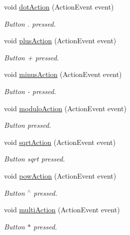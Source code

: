 \begin{DoxyCompactItemize}
void \hyperlink{classGUI__Controller_abab880a50c742388974a9f96e147e1f5}{dot\+Action} (Action\+Event event)
\begin{DoxyCompactList}\small\item\em Button \textquotesingle{}.\textquotesingle{} pressed. \end{DoxyCompactList}\item 
void \hyperlink{classGUI__Controller_a1a2f902a1462a48bf26769d4ee3689c7}{plus\+Action} (Action\+Event event)
\begin{DoxyCompactList}\small\item\em Button \textquotesingle{}+\textquotesingle{} pressed. \end{DoxyCompactList}\item 
void \hyperlink{classGUI__Controller_a01a8f10c74c34426cd923b699d5da5b3}{minus\+Action} (Action\+Event event)
\begin{DoxyCompactList}\small\item\em Button \textquotesingle{}-\/\textquotesingle{} pressed. \end{DoxyCompactList}\item 
void \hyperlink{classGUI__Controller_a0a15fea5ff39777ca3ec7f52e5d35500}{modulo\+Action} (Action\+Event event)
\begin{DoxyCompactList}\small\item\em Button \textquotesingle{}\textquotesingle{} pressed. \end{DoxyCompactList}\item 
void \hyperlink{classGUI__Controller_a504ebbabf072956cac740e9fdc4e68c9}{sqrt\+Action} (Action\+Event event)
\begin{DoxyCompactList}\small\item\em Button \textquotesingle{}sqrt\textquotesingle{} pressed. \end{DoxyCompactList}\item 
void \hyperlink{classGUI__Controller_a5d06ebc913880c0166c64ce44820ede5}{pow\+Action} (Action\+Event event)
\begin{DoxyCompactList}\small\item\em Button \textquotesingle{}$^\wedge$\textquotesingle{} pressed. \end{DoxyCompactList}\item 
void \hyperlink{classGUI__Controller_a3e8f8e68324279d1a1ca47b25f76bd03}{multi\+Action} (Action\+Event event)
\begin{DoxyCompactList}\small\item\em Button \textquotesingle{}$\ast$\textquotesingle{} pressed. \end{DoxyCompactList}\item 

\end{DoxyCompactItemize}
